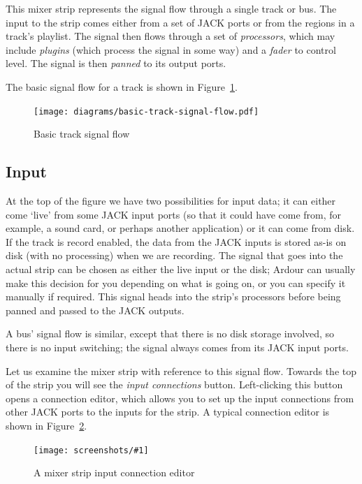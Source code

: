\documentclass[10pt,a4paper]{book}
\newcommand{\screenshot}[3]{%
\begin{figure}[ht]%
\begin{center}
\texttt{[image: screenshots/\#1]}
\end{center}
\caption{#2}
\label{#3}
\end{figure}}
\begin{document}
This mixer strip represents the signal flow through a single track or
bus.  The input to the strip comes either from a set of JACK ports or
from the regions in a track's playlist.  The signal then flows through
a set of \emph{processors}, which may include \emph{plugins} (which
process the signal in some way) and a \emph{fader} to control level.
The signal is then \emph{panned} to its output ports.

The basic signal flow for a track is shown in
Figure~\ref{fig:basic-track-signal-flow}.

\begin{figure}[ht]
\begin{center}
\texttt{[image: diagrams/basic-track-signal-flow.pdf]}
\end{center}
\caption{Basic track signal flow}
\label{fig:basic-track-signal-flow}
\end{figure}

\subsection{Input}

At the top of the figure we have two possibilities for input data; it
can either come `live' from some JACK input ports (so that it could
have come from, for example, a sound card, or perhaps another
application) or it can come from disk.  If the track is record
enabled, the data from the JACK inputs is stored as-is on disk (with
no processing) when we are recording.  The signal that goes into the
actual strip can be chosen as either the live input or the disk;
Ardour can usually make this decision for you depending on what is
going on, or you can specify it manually if required.  This signal
heads into the strip's processors before being panned and passed to
the JACK outputs.

A bus' signal flow is similar, except that there is no disk storage
involved, so there is no input switching; the signal always comes from
its JACK input ports.

Let us examine the mixer strip with reference to this signal flow.
Towards the top of the strip you will see the \emph{input connections}
button.  Left-clicking this button opens a connection editor, which
allows you to set up the input connections from other JACK ports to
the inputs for the strip.  A typical connection editor is shown in
Figure~\ref{fig:input-connection-matrix}.

\screenshot{input-connection-matrix.png}{A mixer strip input connection editor}{fig:input-connection-matrix}
\end{document}
